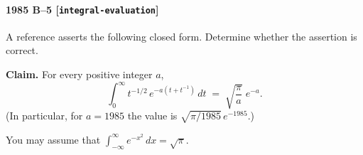 \paragraph{1985 B--5 \textnormal{[\texttt{integral-evaluation}]}}
A reference asserts the following closed form. Determine whether the
assertion is correct.

\textbf{Claim.} For every positive integer $a$,
\[
\int_0^\infty t^{-1/2}\, e^{-a(t + t^{-1})}\,dt \;=\;
\sqrt{\frac{\pi}{a}}\;e^{-a}.
\]
(In particular, for $a = 1985$ the value is $\sqrt{\pi/1985}\,e^{-1985}$.)

You may assume that $\int_{-\infty}^\infty e^{-x^2}\,dx = \sqrt{\pi}$.
